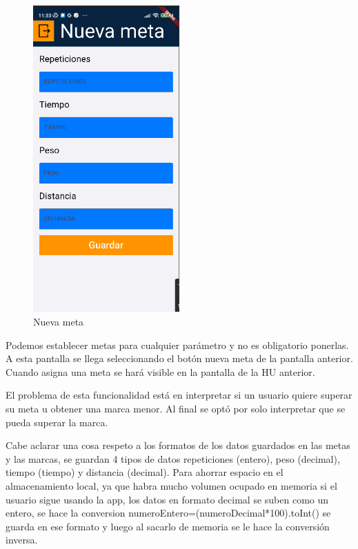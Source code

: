 \begin{figure}[H]
   \centering
    \includegraphics[width=0.5\textwidth]{pantallas/NuevaMeta.png}
    \caption{Nueva meta}
    \label{fig:NuevaMeta}
\end{figure}

Podemos establecer metas para cualquier parámetro y no es obligatorio ponerlas. A esta pantalla se llega seleccionando el botón nueva meta de la pantalla anterior. Cuando asigna una meta se hará visible en la pantalla de la HU anterior.

El problema de esta funcionalidad está en interpretar si un usuario quiere superar su meta u obtener una marca menor. Al final se optó por solo interpretar que se pueda superar la marca.

Cabe aclarar una cosa respeto a los formatos de los datos guardados en las metas y las marcas, se guardan 4 tipos de datos repeticiones (entero), peso (decimal), tiempo (tiempo) y distancia (decimal). Para ahorrar espacio en el almacenamiento local, ya que habra mucho volumen ocupado en memoria si el usuario sigue usando la app, los datos en formato decimal se suben como un entero, se hace la conversion numeroEntero=(numeroDecimal*100).toInt() se guarda en ese formato y luego al sacarlo de memoria se le hace la conversión inversa.

